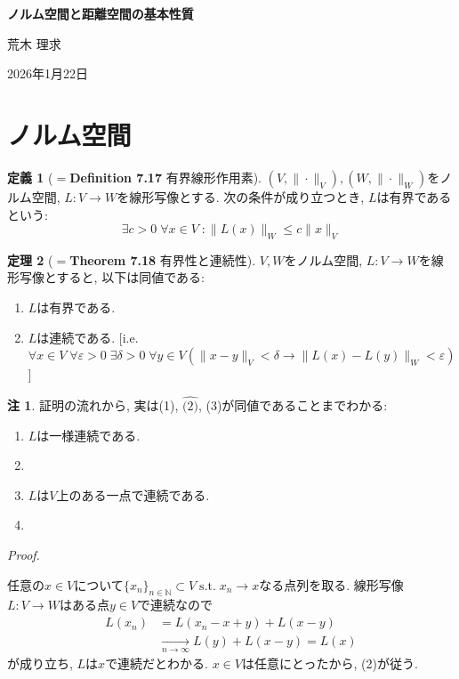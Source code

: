 \documentclass{jsarticle}
\newcommand{\N}{\mathbb{N}}%
\renewenvironment{proof}[1][Proof]{%
\begin{proofbox}%
\textit{#1. }\ignorespaces
}{%
\hfill\qedsymbol%
\end{proofbox}%
}
\theoremstyle{definition}
\newtheorem{thm}{定理}[section]
\newtheorem{dfn}[thm]{定義}
\newtheorem*{rem*}{注}
\begin{document}
\begin{center}
{\large \textbf{ノルム空間と距離空間の基本性質}}\par
\vspace{0.5em}
荒木 理求\par
2026年1月22日
\end{center}
\section{ノルム空間}
\begin{dfn}[$=$\textbf{Definition 7.17} 有界線形作用素]
$(V, \|\cdot\|_{V}), (W, \|\cdot\|_{W})$をノルム空間, $L \colon V \to W$を線形写像とする. 次の条件が成り立つとき, $L$は有界であるという$\colon$
\[
\exists c > 0 \;\forall x \in V\; \colon \|L(x)\|_{W} \le c\|x\|_{V} 
\]
\end{dfn}

\begin{thm}[$=$\textbf{Theorem 7.18} 有界性と連続性]
$V, W$をノルム空間, $L \colon V \to W$を線形写像とすると, 以下は同値である$\colon$
\begin{enumerate}
\item[(1)] $L$は有界である.
\item[(2)] $L$は連続である. [i.e. $\forall x \in V\;\forall \varepsilon > 0\; \exists \delta > 0\;\forall y\in V \left(\|x-y\|_{V}<\delta \to \|L(x)-L(y)\|_{W} < \varepsilon\right)$]
\end{enumerate}
\end{thm}
\begin{rem*}
証明の流れから, 実は(1), $\hat{\text{(2)}}$, (3)が同値であることまでわかる$\colon$
\begin{enumerate}
\item[$\hat{\text{(2)}}$] $L$は一様連続である.
\item[] [i.e. $\forall \varepsilon > 0\; \exists \delta > 0\;\forall x, y\in V \left(\|x-y\|_{V}<\delta \to \|L(x)-L(y)\|_{W} < \varepsilon\right)$]

\item[(3)] $L$は$V$上のある一点で連続である. 
\item[] [i.e. $\exists x \in V\;\forall \varepsilon > 0\; \exists \delta > 0\;\forall y\in V \left(\|x-y\|_{V}<\delta \to \|L(x)-L(y)\|_{W} < \varepsilon\right)$]
\end{enumerate}
\end{rem*}
\begin{proof}
\hspace{0.5em}任意の$x\in V$について$\{x_n\}_{n\in\N}\subset V\;\text{s.t.}\; x_n \to x$なる点列を取る. 線形写像$L \colon V \to W$はある点$y\in V$で連続なので
\begin{align*}
L(x_n) &=  L(x_n-x+y) + L(x-y) \\
         &\xrightarrow[n\to \infty]{} L(y) + L(x-y) = L(x)
\end{align*}
が成り立ち, $L$は$x$で連続だとわかる. $x\in V$は任意にとったから, (2)が従う.
\end{proof}
\end{document}
